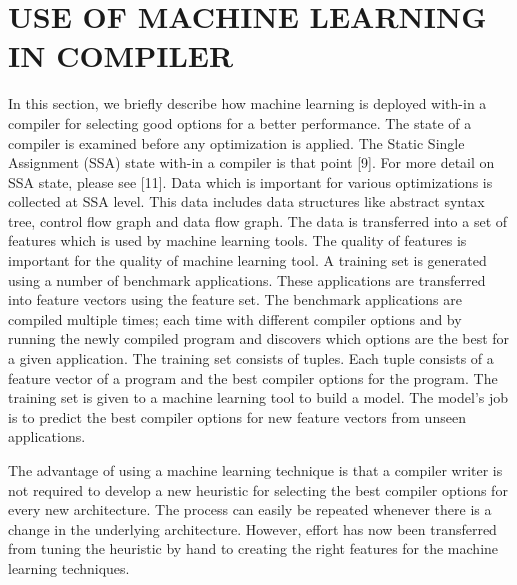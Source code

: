 \documentclass[conference]{IEEEtran}
\begin{document}
\section{USE OF MACHINE LEARNING IN COMPILER}
In this section, we briefly describe how machine learning is deployed with-in a compiler for selecting good options for a better performance. The state of a compiler is examined before any optimization is applied. The Static Single Assignment (SSA) state with-in a compiler is that point [9]. For more detail on SSA state, please see [11]. Data which is important for various optimizations is collected at SSA level. This data includes data structures like abstract syntax tree, control flow graph and data flow graph. The data is transferred into a set of features which is used by machine learning tools. The quality of features is important for the quality of machine learning tool. A training set is generated using a number of benchmark applications. These applications are transferred into feature vectors using the feature set. The benchmark applications are compiled multiple times; each time with different compiler options and by running the newly compiled program and discovers which options are the best for a given application. The training set consists of tuples. Each tuple consists of a feature vector of a program and the best compiler options for the program. The training set is given to a machine learning tool to build a model. The model’s job is to predict the best compiler options for new feature vectors from unseen applications.\par

The advantage of using a machine learning technique is that a compiler writer is not required to develop a new heuristic for selecting the best compiler options for every new architecture. The process can easily be repeated whenever there is a change in the underlying architecture.
However, effort has now been transferred from tuning the heuristic by hand to creating the right features for the machine learning techniques.
\end{document}
